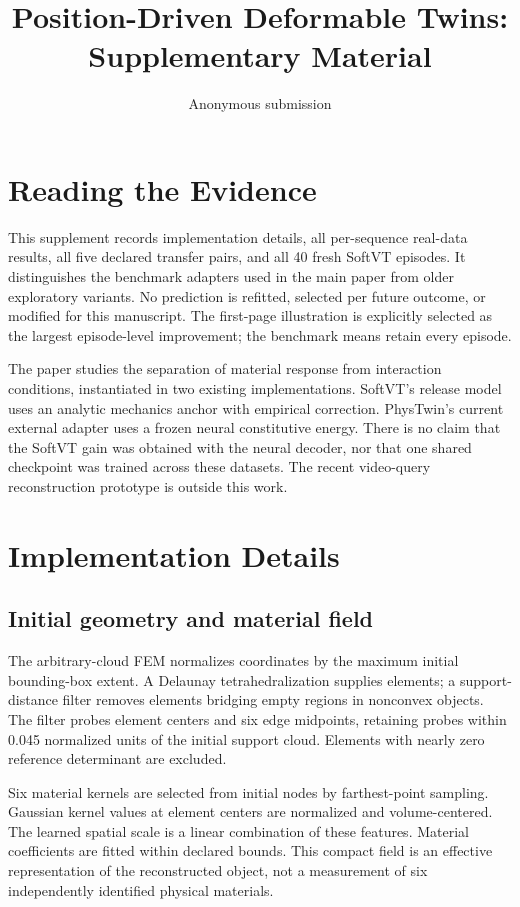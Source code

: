 \documentclass[10pt,twocolumn,letterpaper]{article}
\title{Position-Driven Deformable Twins:\\Supplementary Material}
\author{Anonymous submission}
\begin{document}
\maketitle
\section{Reading the Evidence}
This supplement records implementation details, all per-sequence real-data results, all five declared transfer pairs, and all 40 fresh SoftVT episodes. It distinguishes the benchmark adapters used in the main paper from older exploratory variants. No prediction is refitted, selected per future outcome, or modified for this manuscript. The first-page illustration is explicitly selected as the largest episode-level improvement; the benchmark means retain every episode.

The paper studies the separation of material response from interaction conditions, instantiated in two existing implementations. SoftVT's release model uses an analytic mechanics anchor with empirical correction. PhysTwin's current external adapter uses a frozen neural constitutive energy. There is no claim that the SoftVT gain was obtained with the neural decoder, nor that one shared checkpoint was trained across these datasets. The recent video-query reconstruction prototype is outside this work.

\section{Implementation Details}
\subsection{Initial geometry and material field}
The arbitrary-cloud FEM normalizes coordinates by the maximum initial bounding-box extent. A Delaunay tetrahedralization supplies elements; a support-distance filter removes elements bridging empty regions in nonconvex objects. The filter probes element centers and six edge midpoints, retaining probes within 0.045 normalized units of the initial support cloud. Elements with nearly zero reference determinant are excluded.

Six material kernels are selected from initial nodes by farthest-point sampling. Gaussian kernel values at element centers are normalized and volume-centered. The learned spatial scale is a linear combination of these features. Material coefficients are fitted within declared bounds. This compact field is an effective representation of the reconstructed object, not a measurement of six independently identified physical materials.
\end{document}
